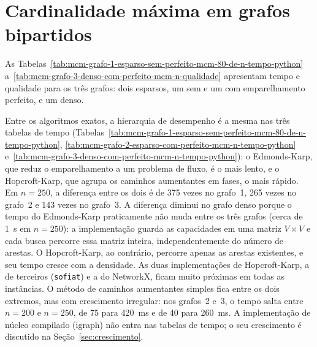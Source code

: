 \section{Cardinalidade máxima em grafos bipartidos}
\label{sec:res_mcm}

As Tabelas~\ref{tab:mcm-grafo-1-esparso-sem-perfeito-mcm-80-de-n-tempo-python}
a~\ref{tab:mcm-grafo-3-denso-com-perfeito-mcm-n-qualidade} apresentam tempo e
qualidade para os três grafos: dois esparsos, um sem e um com emparelhamento
perfeito, e um denso.








Entre os algoritmos exatos, a hierarquia de desempenho é a mesma nas três
tabelas de tempo
(Tabelas~\ref{tab:mcm-grafo-1-esparso-sem-perfeito-mcm-80-de-n-tempo-python},
\ref{tab:mcm-grafo-2-esparso-com-perfeito-mcm-n-tempo-python}
e~\ref{tab:mcm-grafo-3-denso-com-perfeito-mcm-n-tempo-python}): o Edmonds-Karp,
que reduz o emparelhamento a um problema de fluxo, é o mais lento, e o
Hopcroft-Karp, que agrupa os caminhos aumentantes em fases, o mais rápido. Em
$n = 250$, a diferença entre os dois é de 375 vezes no grafo~1, 265 vezes no
grafo~2 e 143 vezes no grafo~3. A diferença diminui no grafo denso porque o tempo
do Edmonds-Karp praticamente não muda entre os três grafos (cerca de 1~s em
$n = 250$): a implementação guarda as capacidades em uma matriz $V \times V$ e
cada busca percorre essa matriz inteira, independentemente do número de arestas.
O Hopcroft-Karp, ao contrário, percorre apenas as arestas existentes, e seu tempo
cresce com a densidade. As duas implementações de Hopcroft-Karp, a de terceiros (\texttt{sofiat}) e a do
NetworkX, ficam muito próximas em todas as instâncias. O método de caminhos aumentantes
simples fica entre os dois extremos, mas com crescimento irregular: nos grafos~2
e~3, o tempo salta entre $n = 200$ e $n = 250$, de 75 para 420~ms e de 40 para
260~ms. A implementação de núcleo compilado (igraph) não entra nas tabelas de tempo; o
seu crescimento é discutido na Seção~\ref{sec:crescimento}.

